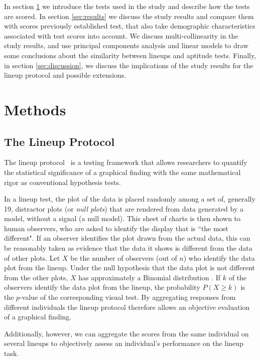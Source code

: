 \documentclass[journal]{vgtc}\usepackage[]{graphicx}\usepackage[]{color}
\begin{document}
In section \ref{sec:methods} we introduce the tests used in the study and describe how the tests are scored. In section \ref{sec:results} we discuss the study results and compare them with scores previously established test, that also take  demographic characteristics associated with test scores into account. We discuss multi-collinearity in the study results, and use principal components analysis and linear models to draw some conclusions about the similarity between lineups and aptitude tests. Finally, in section \ref{sec:discussion}, we discuss the implications of the study results for the lineup protocol and  possible extensions. 


\section{Methods}\label{sec:methods}

\subsection{The Lineup Protocol}
The lineup protocol~\cite{hofmann2012graphical,wickham2010graphical, buja2009statistical} is a testing framework that allows researchers to quantify the statistical significance of a graphical finding with the same mathematical rigor as conventional hypothesis tests.

In a lineup test, the plot of the data is placed randomly among a set of, generally 19, distractor plots (or {\it null plots}) that are rendered from data generated by a model, without a signal (a null model). This sheet of charts is then shown to human observers, who are asked to identify the display that is ``the most different". If an observer identifies the plot drawn from the actual data, this can be reasonably taken as evidence that the data it shows is different from the data of other plots.
Let $X$ be the number of observers (out of $n$) who identify the data plot from the lineup. Under the null hypothesis that the data plot is not different from the other plots, $X$ has approximately a Binomial distribution \cite{wickham2010graphical, majumder2013validation}. If $k$ of the observers identify the data plot from the lineup, the probability $P(X \ge k)$ is the $p$-value of the corresponding visual test. 
%
By aggregating responses from different individuals the lineup protocol therefore allows an objective evaluation of a graphical finding. 

Additionally, however, we can aggregate the scores from the same individual on several lineups to objectively assess an individual's performance on the lineup task. 
\end{document}
